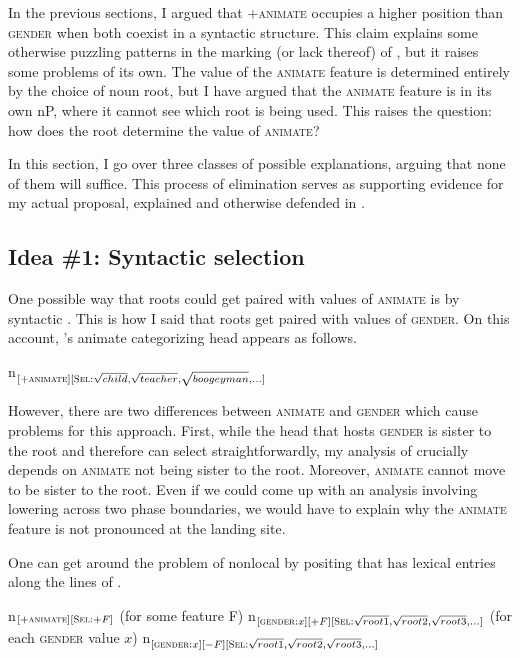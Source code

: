 \documentclass[output=paper,newtxmath,modfonts,nonflat,hidelinks]{langsci/langscibook}
\begin{document}
In the previous sections, I argued that +\textsc{animate} occupies a higher position than \textsc{gender} when both coexist in a syntactic structure.  This claim explains some otherwise puzzling patterns in the marking (or lack thereof) of , but it raises some problems of its own.  The value of the \textsc{animate} feature is determined entirely by the choice of noun root, but I have argued that the \textsc{animate} feature is in its own nP, where it cannot see which root is being used.  This raises the question: how does the root determine the value of \textsc{animate}?

In this section, I go over three classes of possible explanations, arguing that none of them will suffice.  This process of elimination serves as supporting evidence for my actual proposal, explained and otherwise defended in .

\subsection{Idea \#1: Syntactic selection} \label{sec:pesetsky:syntacticselectionidea}

One possible way that roots could get paired with values of \textsc{animate} is by syntactic .  This is how I said that roots get paired with values of \textsc{gender}.  On this account, 's animate categorizing head appears as follows.

\ea\label{ex:pesetsky:optiona}  n$_{[+\textsc{animate}][\textsc{Sel}: \sqrt{child}, \sqrt{teacher}, \sqrt{boogeyman}, ...]}$  \z

However, there are two differences between \textsc{animate} and \textsc{gender} which cause problems for this approach.  First, while the head that hosts \textsc{gender} is sister to the root and therefore can select straightforwardly, my analysis of  crucially depends on \textsc{animate} not being sister to the root.  Moreover, \textsc{animate} cannot move to be sister to the root.  Even if we could come up with an analysis involving lowering across two phase boundaries, we would have to explain why the \textsc{animate} feature is not pronounced at the landing site.

One can get around the problem of nonlocal  by positing that  has lexical entries along the lines of .

\ea\label{ex:pesetsky:optionb} \ea n$_{[+\textsc{animate}][\textsc{Sel}:+F]}$ (for some feature F) 
\ex  n$_{[\textsc{gender}:x][+F][\textsc{Sel}: \sqrt{root1}, \sqrt{root2}, \sqrt{root3}, ...]}$ (for each \textsc{gender} value $x$) 
\ex n$_{[\textsc{gender}:x][-F][\textsc{Sel}: \sqrt{root1}, \sqrt{root2}, \sqrt{root3}, ...]}$ \\ \z \z
\end{document}
